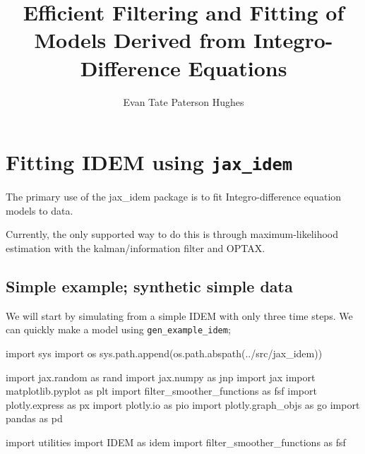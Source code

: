 \documentclass[
]{report}
\title{Efficient Filtering and Fitting of Models Derived from
Integro-Difference Equations}
\author{Evan Tate Paterson Hughes}
\date{}
\newenvironment{Shaded}{\begin{snugshade}}{\end{snugshade}}
\newcommand{\ImportTok}[1]{\textcolor[rgb]{0.00,0.46,0.62}{#1}}
\newcommand{\NormalTok}[1]{\textcolor[rgb]{0.00,0.23,0.31}{#1}}
\newcommand{\StringTok}[1]{\textcolor[rgb]{0.13,0.47,0.30}{#1}}
\renewcommand*\contentsname{Table of contents}
\newcommand\contentsname{Table of contents}
\begin{document}
\maketitle

\renewcommand*\contentsname{Table of contents}
{
\hypersetup{linkcolor=}
\setcounter{tocdepth}{2}
\tableofcontents
}

\chapter{\texorpdfstring{Fitting IDEM using
\texttt{jax\_idem}}{Fitting IDEM using jax\_idem}}\label{fitting-idem-using-jax_idem}

The primary use of the jax\_idem package is to fit Integro-difference
equation models to data.

Currently, the only supported way to do this is through
maximum-likelihood estimation with the kalman/information filter and
OPTAX.

\section{Simple example; synthetic simple
data}\label{simple-example-synthetic-simple-data}

We will start by simulating from a simple IDEM with only three time
steps. We can quickly make a model using \texttt{gen\_example\_idem};

\begin{Shaded}
\begin{Highlighting}[]
\ImportTok{import}\NormalTok{ sys}
\ImportTok{import}\NormalTok{ os}
\NormalTok{sys.path.append(os.path.abspath(}\StringTok{\textquotesingle{}../src/jax\_idem\textquotesingle{}}\NormalTok{))}

\ImportTok{import}\NormalTok{ jax.random }\ImportTok{as}\NormalTok{ rand}
\ImportTok{import}\NormalTok{ jax.numpy }\ImportTok{as}\NormalTok{ jnp}
\ImportTok{import}\NormalTok{ jax}
\ImportTok{import}\NormalTok{ matplotlib.pyplot }\ImportTok{as}\NormalTok{ plt}
\ImportTok{import}\NormalTok{ filter\_smoother\_functions }\ImportTok{as}\NormalTok{ fsf}
\ImportTok{import}\NormalTok{ plotly.express }\ImportTok{as}\NormalTok{ px}
\ImportTok{import}\NormalTok{ plotly.io }\ImportTok{as}\NormalTok{ pio}
\ImportTok{import}\NormalTok{ plotly.graph\_objs }\ImportTok{as}\NormalTok{ go}
\ImportTok{import}\NormalTok{ pandas }\ImportTok{as}\NormalTok{ pd}

\ImportTok{import}\NormalTok{ utilities}
\ImportTok{import}\NormalTok{ IDEM }\ImportTok{as}\NormalTok{ idem}
\ImportTok{import}\NormalTok{ filter\_smoother\_functions }\ImportTok{as}\NormalTok{ fsf}
\end{Highlighting}
\end{Shaded}
\end{document}

